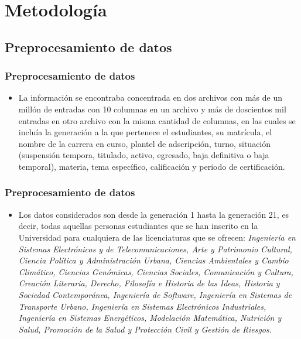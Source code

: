 \documentclass[xcolor=dvipsnames]{beamer}
\begin{document}
\section{Metodolog\'ia}

\subsection{Preprocesamiento de datos}

\begin{frame}\frametitle{Preprocesamiento de datos}
\begin{itemize}

\item La informaci\'on se encontraba concentrada en dos archivos con m\'as de un mill\'on de entradas con 10 columnas en un archivo y m\'as de doscientos mil entradas en otro archivo con la misma cantidad de columnas, en las cuales se inclu\'ia la generaci\'on a la que pertenece el estudiantes, su matr\'icula, el nombre de la carrera en curso,  plantel de adscripci\'on, turno, situaci\'on (suspensi\'on tempora, titulado,   activo,  egresado,  baja definitiva o baja temporal), materia, tema espec\'ifico, calificaci\'on y periodo de certificaci\'on.


\end{itemize}

\end{frame}


\begin{frame}\frametitle{Preprocesamiento de datos}
\begin{itemize}

\item Los datos considerados son desde la generaci\'on 1 hasta la generaci\'on 21, es decir, todas aquellas personas estudiantes que se han inscrito en la Universidad para cualquiera de las licenciaturas que se ofrecen: \textit{Ingenier\'ia en Sistemas Electr\'onicos y de Telecomunicaciones, Arte y Patrimonio Cultural, Ciencia Pol\'itica y Administraci\'on Urbana, Ciencias Ambientales y Cambio Clim\'atico, Ciencias Gen\'omicas, Ciencias Sociales, Comunicaci\'on y Cultura, Creaci\'on Literaria, Derecho, Filosof\'ia e Historia de las Ideas, Historia y Sociedad Contempor\'anea, Ingenier\'ia de Software, Ingenier\'ia en Sistemas de Transporte Urbano, Ingenier\'ia en Sistemas Electr\'onicos Industriales, Ingenier\'ia en Sistemas Energ\'eticos, Modelaci\'on Matem\'atica, Nutrici\'on y Salud, Promoci\'on de la Salud y  Protecci\'on Civil y Gesti\'on de Riesgos.}

\end{itemize}




\end{frame}
\end{document}

